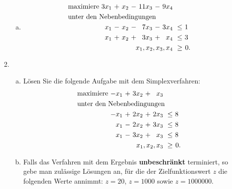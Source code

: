 \documentclass[11pt, a4paper]{article}
\begin{document}
\begin{enumerate}[\bfseries A:]
\begin{enumerate}[\bfseries 1.]
\begin{enumerate}[a)]
\item \begin{align*}
\begin{alignedat}{6}
& \text{maximiere } & 3x_1 &\ + &\ x_2 &\ - &\ 11x_3 &\ - &\ 9x_4 & & \\
& \rlap{unter den Nebenbedingungen} & & & & & & & & & \\
&& x_1 &\ - &\ x_2 &\ - &\ 7x_3 &\ - &\ 3x_4 &\ \leq &\ 1\ \\
&& x_1 &\ + &\ x_2 &\ + &\ 3x_3 &\ + &\  x_4 &\ \leq &\ 3\ \\
&& & & & & & & \llap{$x_1,x_2,x_3,x_4$} &\ \geq &\ 0.
\end{alignedat}
\end{align*}
\end{enumerate}


\item \begin{enumerate}[a)]
	\item Lösen Sie die folgende Aufgabe mit dem Simplexverfahren:
	\begin{align*}
	\begin{alignedat}{5}
	& \text{maximiere } & -x_1 &\ + &\ 3x_2 &\ + &\ x_3 & & \\
	& \rlap{unter den Nebenbedingungen} & & & & & & & \\
	&& -x_1 &\ + &\ 2x_2 &\ + &\ 2x_3 &\ \leq &\ 8\ \\
	&&  x_1 &\ - &\ 2x_2 &\ + &\ 3x_3 &\ \leq &\ 8\ \\
	&&  x_1 &\ - &\ 3x_2 &\ + &\  x_3 &\ \leq &\ 8\ \\
	&&&&&& \llap{$x_1,x_2,x_3$} &\ \geq &\ 0.
	\end{alignedat}
	\end{align*}
	
	\item Falls das Verfahren mit dem Ergebnis \textbf{unbeschränkt} terminiert, so gebe man zulässige Lösungen an, für die der Zielfunktionswert $z$ die folgenden Werte annimmt: $z=20$, $z=1000$ sowie $z=1000000$.
\end{enumerate}

\end{enumerate}
\end{enumerate}
\end{document}
